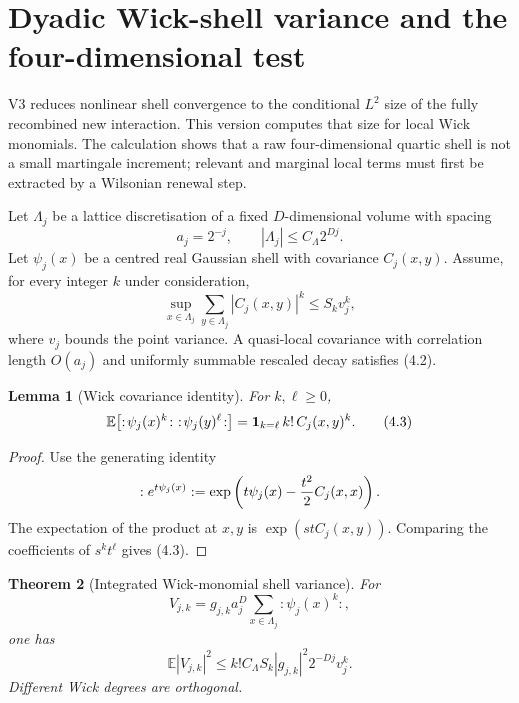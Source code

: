 \documentclass[11pt]{article}
\newtheorem{theorem}{Theorem}[section]
\newtheorem{lemma}[theorem]{Lemma}
\theoremstyle{remark}
\begin{document}
\section{Dyadic Wick-shell variance and the four-dimensional test}
\label{sec:v12v4}

V3 reduces nonlinear shell convergence to the conditional
\(L^2\) size of the fully recombined new interaction.  This version
computes that size for local Wick monomials.  The calculation shows
that a raw four-dimensional quartic shell is not a small martingale
increment; relevant and marginal local terms must first be extracted
by a Wilsonian renewal step.

Let \(\Lambda_j\) be a lattice discretisation of a fixed
\(D\)-dimensional volume with spacing
\[
                              a_j=2^{-j},\qquad
                              |\Lambda_j|\le C_\Lambda2^{Dj}. \tag{4.1}
\]
Let \(\psi_j(x)\) be a centred real Gaussian shell with covariance
\(C_j(x,y)\).  Assume, for every integer \(k\) under consideration,
\[
 \sup_{x\in\Lambda_j}
       \sum_{y\in\Lambda_j}|C_j(x,y)|^k
                              \le S_kv_j^k,                 \tag{4.2}
\]
where \(v_j\) bounds the point variance.  A quasi-local covariance
with correlation length \(O(a_j)\) and uniformly summable rescaled
decay satisfies (4.2).

\begin{lemma}[Wick covariance identity]
\label{lem:v12v4-wick}
For \(k,\ell\ge0\),
\[
 \mathbb E\!\left[
 :\!\psi_j(x)^k\!:\ :\!\psi_j(y)^\ell\!:
 \right]
 ={\bf1}_{k=\ell}\,k!\,C_j(x,y)^k.                          \tag{4.3}
\]
\end{lemma}

\begin{proof}
Use the generating identity
\[
 :e^{t\psi_j(x)}:
 =\exp\left(t\psi_j(x)-{t^2\over2}C_j(x,x)\right).
\]
The expectation of the product at \(x,y\) is
\(\exp(stC_j(x,y))\).  Comparing the coefficients of
\(s^kt^\ell\) gives (4.3).
\end{proof}

\begin{theorem}[Integrated Wick-monomial shell variance]
\label{thm:v12v4-variance}
For
\[
 V_{j,k}=g_{j,k}a_j^D
       \sum_{x\in\Lambda_j}:\!\psi_j(x)^k\!:,                \tag{4.4}
\]
one has
\[
 \mathbb E|V_{j,k}|^2
 \le k!C_\Lambda S_k|g_{j,k}|^2
             2^{-Dj}v_j^k.                                 \tag{4.5}
\]
Different Wick degrees are orthogonal.
\end{theorem}
\end{document}
